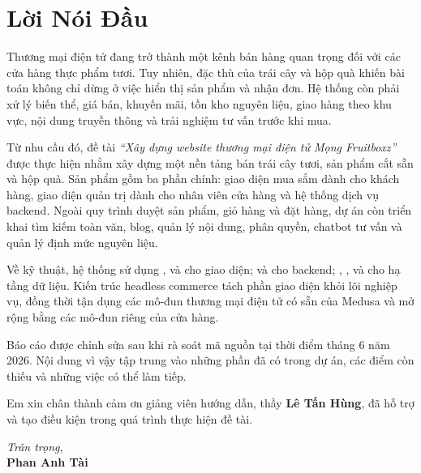 \chapter*{Lời Nói Đầu}

Thương mại điện tử đang trở thành một kênh bán hàng quan trọng đối với các cửa hàng thực phẩm tươi. Tuy nhiên, đặc thù của trái cây và hộp quà khiến bài toán không chỉ dừng ở việc hiển thị sản phẩm và nhận đơn. Hệ thống còn phải xử lý biến thể, giá bán, khuyến mãi, tồn kho nguyên liệu, giao hàng theo khu vực, nội dung truyền thông và trải nghiệm tư vấn trước khi mua.

Từ nhu cầu đó, đề tài \textit{``Xây dựng website thương mại điện tử Mọng Fruitboxz''} được thực hiện nhằm xây dựng một nền tảng bán trái cây tươi, sản phẩm cắt sẵn và hộp quà. Sản phẩm gồm ba phần chính: giao diện mua sắm dành cho khách hàng, giao diện quản trị dành cho nhân viên cửa hàng và hệ thống dịch vụ backend. Ngoài quy trình duyệt sản phẩm, giỏ hàng và đặt hàng, dự án còn triển khai tìm kiếm toàn văn, blog, quản lý nội dung, phân quyền, chatbot tư vấn và quản lý định mức nguyên liệu.

Về kỹ thuật, hệ thống sử dụng ,  và  cho giao diện;  và  cho backend; , ,  và  cho hạ tầng dữ liệu. Kiến trúc headless commerce tách phần giao diện khỏi lõi nghiệp vụ, đồng thời tận dụng các mô-đun thương mại điện tử có sẵn của Medusa và mở rộng bằng các mô-đun riêng của cửa hàng.

Báo cáo được chỉnh sửa sau khi rà soát mã nguồn tại thời điểm tháng 6 năm 2026. Nội dung vì vậy tập trung vào những phần đã có trong dự án, các điểm còn thiếu và những việc có thể làm tiếp.

Em xin chân thành cảm ơn giảng viên hướng dẫn, thầy \textbf{Lê Tấn Hùng}, đã hỗ trợ và tạo điều kiện trong quá trình thực hiện đề tài.

\vspace{20pt}
\begin{flushright}
  \textit{Trân trọng,}\\[6pt]
  \textbf{Phan Anh Tài}
\end{flushright}
\newpage
